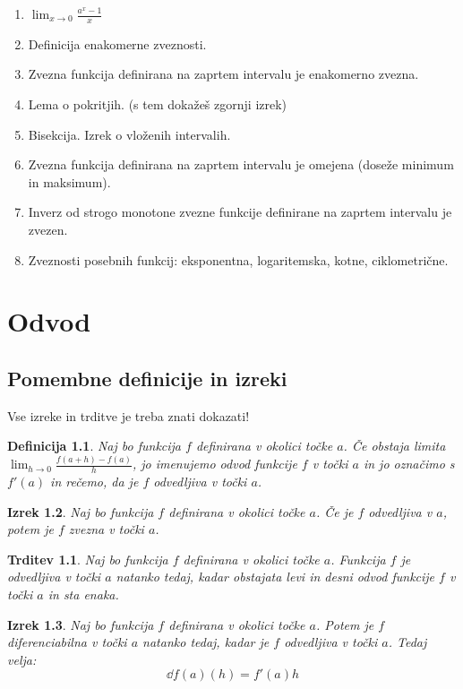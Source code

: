 \documentclass[a4paper,12pt]{report}
\newtheorem{izrek}{Izrek}[section]
\newtheorem{definicija}[izrek]{Definicija}
\newtheorem{trditev}{Trditev}
\begin{document}
\begin{enumerate}
    \item $\lim_{x \to 0} \frac{a^x - 1}{x}$
    \item Definicija enakomerne zveznosti.
    \item Zvezna funkcija definirana na zaprtem intervalu je enakomerno zvezna.
    \item Lema o pokritjih. (s tem dokažeš zgornji izrek)
    \item Bisekcija. Izrek o vloženih intervalih.
    \item Zvezna funkcija definirana na zaprtem intervalu je omejena (doseže minimum in maksimum).
    \item Inverz od strogo monotone zvezne funkcije definirane na zaprtem intervalu je zvezen.
    \item Zveznosti posebnih funkcij: eksponentna, logaritemska, kotne, ciklometrične.
\end{enumerate}


\chapter{Odvod}

\section*{Pomembne definicije in izreki}

Vse izreke in trditve je treba znati dokazati!

\begin{definicija}
    Naj bo funkcija $f$ definirana v okolici točke $a$. Če obstaja limita
     $\lim_{h\to 0}\frac{f(a+h)-f(a)}{h}$, jo imenujemo odvod funkcije $f$ v 
     točki $a$ in jo označimo s $f'(a)$ in rečemo, da je $f$ odvedljiva v točki $a$.
\end{definicija}

\begin{izrek}
    Naj bo funkcija $f$ definirana v okolici točke $a$. Če je $f$ odvedljiva v $a$, 
    potem je $f$ zvezna v točki $a$.
\end{izrek}

\begin{trditev}
    Naj bo funkcija $f$ definirana v okolici točke $a$. Funkcija $f$ je odvedljiva v točki $a$
     natanko tedaj, kadar obstajata levi in desni odvod funkcije $f$ v točki $a$ in sta enaka.
\end{trditev}

\begin{izrek}
    Naj bo funkcija $f$ definirana v okolici točke $a$. Potem je $f$ diferenciabilna v točki $a$ 
    natanko tedaj, kadar je $f$ odvedljiva v točki $a$. Tedaj velja: $$\dd f(a)(h)=f'(a) h$$ 
\end{izrek}
\end{document}
